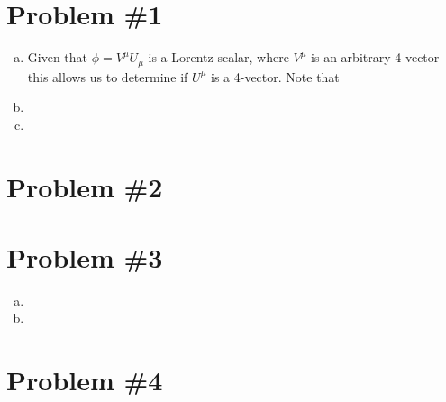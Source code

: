 \documentclass[11pt]{article}
\numberwithin{equation}{section}
\begin{document}


\section{Problem \#1}
\begin{enumerate}[(a)]
\item
    Given that $\phi = V^{\mu}U_{\mu}$ is a Lorentz scalar, where $V^{\mu}$ is an arbitrary 4-vector this allows us
    to determine if $U^{\mu}$ is a 4-vector. Note that 




\item
\item
\end{enumerate}

\pagebreak

\section{Problem \#2}

\pagebreak

\section{Problem \#3}
\begin{enumerate}[(a)]
\item
\item
\end{enumerate}

\pagebreak

\section{Problem \#4}

\pagebreak
\end{document}
